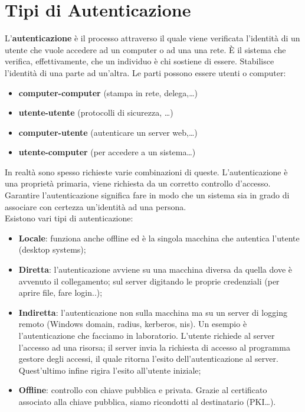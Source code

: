 \section{Tipi di Autenticazione}

L'\textbf{autenticazione} è il processo attraverso il quale viene verificata
l'identità di un utente che vuole
accedere ad un computer o ad una una rete. È il sistema che verifica,
effettivamente, che un
individuo è chi sostiene di essere. Stabilisce l'identità di una parte ad un'altra.
Le parti possono essere utenti o computer:

\begin{itemize}
      \item \textbf{computer-computer} (stampa in rete, delega,…)
      \item \textbf{utente-utente} (protocolli di sicurezza, …)
      \item \textbf{computer-utente} (autenticare un server web,…)
      \item \textbf{utente-computer} (per accedere a un sistema…)
\end{itemize}

In realtà sono spesso richieste varie combinazioni di queste.
L'autenticazione è una proprietà primaria, viene richiesta da un corretto
controllo d'accesso.
Garantire l'autenticazione significa fare in modo che un sistema sia in grado di
associare con
certezza un'identità ad una persona.\\

Esistono vari tipi di autenticazione:

\begin{itemize}
      \item \textbf{Locale}: funziona anche offline ed è la singola macchina
            che autentica l'utente (desktop systems);
      \item \textbf{Diretta}: l'autenticazione avviene su una macchina diversa
            da quella dove è avvenuto il
            collegamento; sul server digitando le proprie credenziali
            (per aprire file, fare login..);
      \item \textbf{Indiretta}: l'autenticazione non sulla macchina ma su un server
            di logging remoto (Windows
            domain, radius, kerberos, nis). Un esempio è l'autenticazione che
            facciamo in laboratorio. L'utente richiede al server l'accesso ad una
            risorsa; il server invia la richiesta di accesso al
            programma gestore degli accessi, il quale ritorna l'esito
            dell'autenticazione al server. Quest'ultimo
            infine rigira l'esito all'utente iniziale;
      \item \textbf{Offline}: controllo con chiave pubblica e privata.
            Grazie al certificato associato alla chiave
            pubblica, siamo ricondotti al destinatario (PKI…).
\end{itemize}

